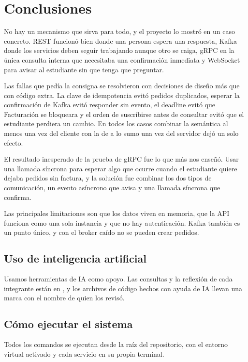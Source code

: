 \section{Conclusiones}

No hay un mecanismo que sirva para todo, y el proyecto lo mostró en un caso concreto. REST funcionó bien donde una persona espera una respuesta, Kafka donde los servicios deben seguir trabajando aunque otro se caiga, gRPC en la única consulta interna que necesitaba una confirmación inmediata y WebSocket para avisar al estudiante sin que tenga que preguntar.

Las fallas que pedía la consigna se resolvieron con decisiones de diseño más que con código extra. La clave de idempotencia evitó pedidos duplicados, esperar la confirmación de Kafka evitó responder  sin evento, el deadline evitó que Facturación se bloqueara y el orden de suscribirse antes de consultar evitó que el estudiante perdiera un cambio. En todos los casos combinar la semántica al menos una vez del cliente con la de a lo sumo una vez del servidor dejó un solo efecto.

El resultado inesperado de la prueba de gRPC fue lo que más nos enseñó. Usar una llamada síncrona para esperar algo que ocurre cuando el estudiante quiere dejaba pedidos sin factura, y la solución fue combinar los dos tipos de comunicación, un evento asíncrono que avisa y una llamada síncrona que confirma.

Las principales limitaciones son que los datos viven en memoria, que la API funciona como una sola instancia y que no hay autenticación. Kafka también es un punto único, y con el broker caído no se pueden crear pedidos.

\subsection{Uso de inteligencia artificial}

Usamos herramientas de IA como apoyo. Las consultas y la reflexión de cada integrante están en , y los archivos de código hechos con ayuda de IA llevan una marca con el nombre de quien los revisó.

\subsection{Cómo ejecutar el sistema}

Todos los comandos se ejecutan desde la raíz del repositorio, con el entorno virtual activado y cada servicio en su propia terminal.

